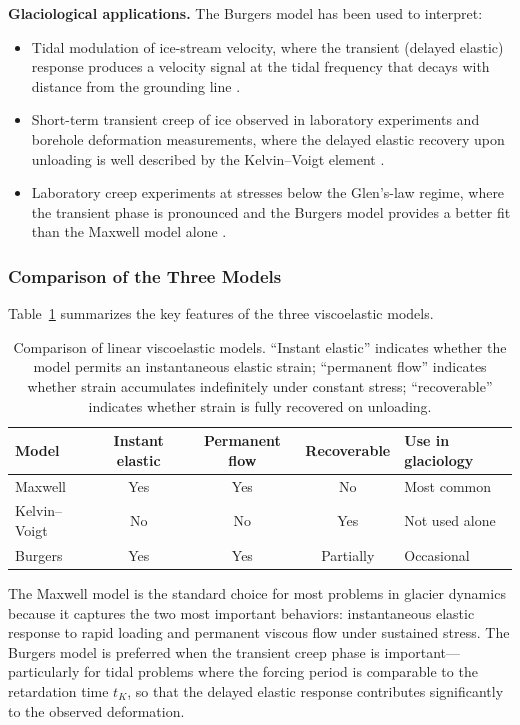 \documentclass[11pt]{article}
\begin{document}
\medskip
\noindent\textbf{Glaciological applications.}  The Burgers model has been used to interpret:
\begin{itemize}
  \item Tidal modulation of ice-stream velocity, where the transient (delayed elastic) response produces a velocity signal at the tidal frequency that decays with distance from the grounding line \cite{Gudmundsson2011,Rosieretal2014}.
  \item Short-term transient creep of ice observed in laboratory experiments and borehole deformation measurements, where the delayed elastic recovery upon unloading is well described by the Kelvin--Voigt element \cite{CuffeyPaterson2010}.
  \item Laboratory creep experiments at stresses below the Glen's-law regime, where the transient phase is pronounced and the Burgers model provides a better fit than the Maxwell model alone \cite{CuffeyPaterson2010}.
\end{itemize}

\subsubsection{Comparison of the Three Models}
\label{sec:model_comparison}

Table~\ref{tab:viscoelastic_models} summarizes the key features of the three viscoelastic models.

\begin{table}[ht]
\centering
\caption{Comparison of linear viscoelastic models.  ``Instant elastic'' indicates whether the model permits an instantaneous elastic strain; ``permanent flow'' indicates whether strain accumulates indefinitely under constant stress; ``recoverable'' indicates whether strain is fully recovered on unloading.}
\label{tab:viscoelastic_models}
\begin{tabular}{lcccl}
\toprule
\textbf{Model} & \textbf{Instant elastic} & \textbf{Permanent flow} & \textbf{Recoverable} & \textbf{Use in glaciology} \\
\midrule
Maxwell & Yes & Yes & No & Most common \\
Kelvin--Voigt & No & No & Yes & Not used alone \\
Burgers & Yes & Yes & Partially & Occasional \\
\bottomrule
\end{tabular}
\end{table}

\noindent The Maxwell model is the standard choice for most problems in glacier dynamics because it captures the two most important behaviors: instantaneous elastic response to rapid loading and permanent viscous flow under sustained stress.  The Burgers model is preferred when the transient creep phase is important---particularly for tidal problems where the forcing period is comparable to the retardation time $t_K$, so that the delayed elastic response contributes significantly to the observed deformation.
\end{document}
